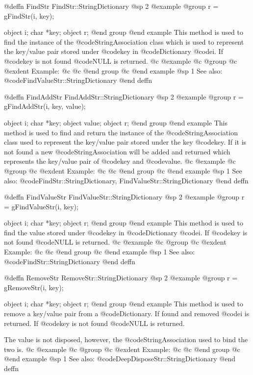 @deffn {FindStr} FindStr::StringDictionary
@sp 2
@example
@group
r = gFindStr(i, key);

object  i;
char    *key;
object  r;
@end group
@end example
This method is used to find the instance of the @code{StringAssociation}
class which is used to represent the key/value pair stored under
@code{key} in @code{Dictionary} @code{i}.  If @code{key} is not found
@code{NULL} is returned.
@c @example
@c @group
@c @exdent Example:
@c 
@c @end group
@c @end example
@sp 1
See also:  @code{FindValueStr::StringDictionary}
@end deffn










@deffn {FindAddStr} FindAddStr::StringDictionary
@sp 2
@example
@group
r = gFindAddStr(i, key, value);

object  i;
char    *key;
object  value;
object  r;
@end group
@end example
This method is used to find and return the instance of the
@code{StringAssociation} class used to represent the key/value pair
stored under the key @code{key}.  If it is not found a new
@code{StringAssociation} will be added and returned which represents the
key/value pair of @code{key} and @code{value}.
@c @example
@c @group
@c @exdent Example:
@c 
@c @end group
@c @end example
@sp 1
See also:  @code{FindStr::StringDictionary, FindValueStr::StringDictionary}
@end deffn









@deffn {FindValueStr} FindValueStr::StringDictionary
@sp 2
@example
@group
r = gFindValueStr(i, key);

object  i;
char    *key;
object  r;
@end group
@end example
This method is used to find the value stored under @code{key} in
@code{Dictionary} @code{i}.  If @code{key} is not found @code{NULL} is
returned.
@c @example
@c @group
@c @exdent Example:
@c 
@c @end group
@c @end example
@sp 1
See also:  @code{FindStr::StringDictionary}
@end deffn











@deffn {RemoveStr} RemoveStr::StringDictionary
@sp 2
@example
@group
r = gRemoveStr(i, key);

object  i;
char    *key;
object  r;
@end group
@end example
This method is used to remove a key/value pair from a @code{Dictionary}.
If found and removed @code{i} is returned.  If @code{key} is not found
@code{NULL} is returned.

The value is not disposed, however, the @code{StringAssociation} used to
bind the two is.
@c @example
@c @group
@c @exdent Example:
@c 
@c @end group
@c @end example
@sp 1
See also:  @code{DeepDisposeStr::StringDictionary}
@end deffn







